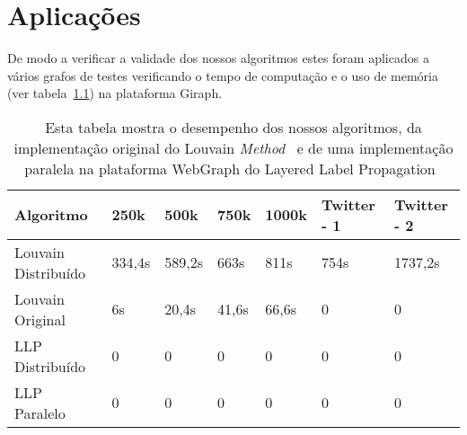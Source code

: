 \chapter{Aplicações}
De modo a verificar a validade dos nossos algoritmos estes foram aplicados a vários grafos de testes verificando o tempo de computação e o uso de memória (ver tabela~\ref{tbl:tm}) na plataforma Giraph.
\begin{table}
	\centering
 \begin{tabular}{|l|l|l|l|l|l|l|}
 \hline
			Algoritmo & 250k & 500k & 750k & 1000k & Twitter - 1 & Twitter - 2\\ \hline
			Louvain Distribuído&334,4s&589,2s&663s&811s&754s&1737,2s\\ \hline
			Louvain Original&6s&20,4s&41,6s&66,6s&0&0\\ \hline
			LLP Distribuído& 0 & 0 &0 &0&0&0\\ \hline
			LLP Paralelo&0&0&0&0&0&0 \\ \hline
		\end{tabular}
		\caption{Esta tabela mostra o desempenho dos nossos algoritmos, da implementação original do Louvain \textit{Method}~\cite{orgLouvain} e de uma implementação paralela na plataforma WebGraph do Layered Label Propagation~\cite{prlLLP}}
		\label{tbl:tm}
\end{table}
